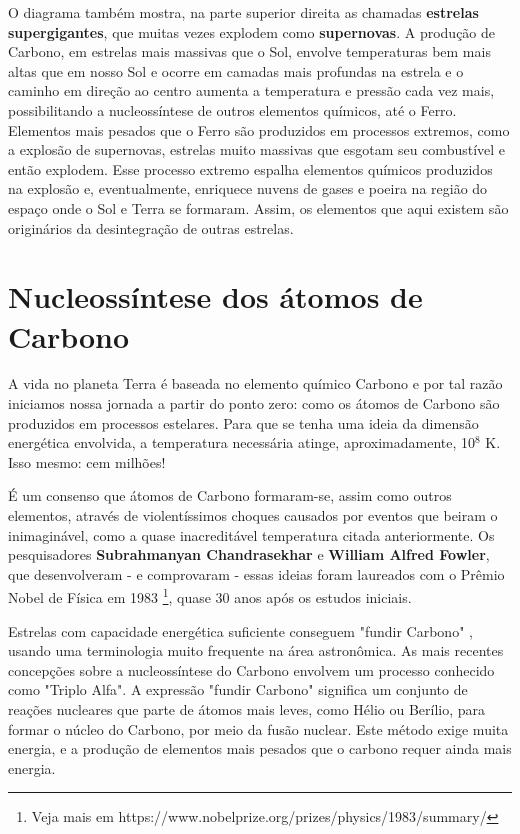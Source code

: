 \documentclass[a4paper,12pt,]{book}
\begin{document}
O diagrama também mostra, na parte superior direita as chamadas \textbf{estrelas supergigantes}, que muitas vezes explodem como \textbf{supernovas}. A produção de Carbono, em estrelas mais massivas que o Sol, envolve temperaturas bem mais altas que em nosso Sol e ocorre em camadas mais profundas na estrela e o caminho em direção ao centro aumenta a temperatura e pressão cada vez mais, possibilitando a nucleossíntese de outros elementos químicos, até o Ferro. Elementos mais pesados que o Ferro são produzidos em processos extremos, como a explosão de supernovas, estrelas muito massivas que esgotam seu combustível e então explodem. Esse processo extremo espalha elementos químicos produzidos na explosão e, eventualmente, enriquece nuvens de gases e poeira na região do espaço onde o Sol e Terra se formaram. Assim, os elementos que aqui existem são originários da desintegração de outras estrelas.

\section{Nucleossíntese dos átomos de Carbono}
A vida no planeta Terra é baseada no elemento químico Carbono e por tal razão iniciamos nossa jornada a partir do ponto zero: como os átomos de Carbono são produzidos em processos estelares. Para que se tenha uma ideia da dimensão energética envolvida, a temperatura necessária atinge, aproximadamente, 10$^8$ K. Isso mesmo: cem milhões!

É um consenso que átomos de Carbono formaram-se, assim como outros elementos, através de violentíssimos choques causados por eventos que beiram o inimaginável, como a quase inacreditável temperatura citada anteriormente. Os pesquisadores \textbf{Subrahmanyan Chandrasekhar} e \textbf{William Alfred Fowler}, que desenvolveram - e comprovaram - essas ideias foram laureados com o Prêmio Nobel de Física em 1983 \footnote{Veja mais em https://www.nobelprize.org/prizes/physics/1983/summary/}, quase 30 anos após os estudos iniciais.

Estrelas com capacidade energética suficiente conseguem "fundir Carbono" , usando uma terminologia muito frequente na área astronômica. As mais recentes concepções sobre a nucleossíntese do Carbono envolvem um processo conhecido como "Triplo Alfa". A expressão "fundir Carbono" significa um conjunto de reações nucleares que parte de átomos mais leves, como Hélio ou Berílio, para formar o núcleo do Carbono, por meio da fusão nuclear. Este método exige muita energia, e a produção de elementos mais pesados que o carbono requer ainda mais energia.
\end{document}
